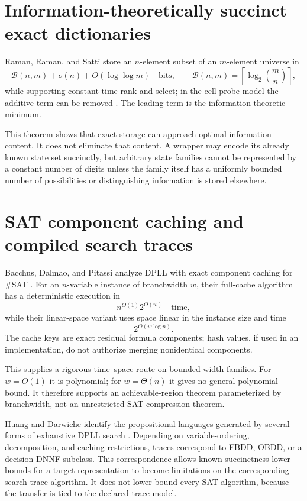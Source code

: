 \documentclass[11pt]{article}
\begin{document}
\section{Information-theoretically succinct exact dictionaries}

Raman, Raman, and Satti store an $n$-element subset of an $m$-element
universe in
\[
 \mathcal B(n,m)+o(n)+O(\log\log m)
 \quad\text{bits},\qquad
 \mathcal B(n,m)=\left\lceil\log_2\binom{m}{n}\right\rceil,
 \tag{11}
\]
while supporting constant-time rank and select; in the cell-probe model the
additive term can be removed \cite{raman2007}.  The leading term is the
information-theoretic minimum.

This theorem shows that exact storage can approach optimal information
content.  It does not eliminate that content.  A wrapper may encode its
already known state set succinctly, but arbitrary state families cannot be
represented by a constant number of digits unless the family itself has a
uniformly bounded number of possibilities or distinguishing information is
stored elsewhere.

\section{SAT component caching and compiled search traces}

Bacchus, Dalmao, and Pitassi analyze DPLL with exact component caching for
\#SAT \cite{bacchus2009}.  For an $n$-variable instance of branchwidth $w$,
their full-cache algorithm has a deterministic execution in
\[
 n^{O(1)}2^{O(w)}\quad\text{time},
 \tag{12}
\]
while their linear-space variant uses space linear in the instance size and
time
\[
 2^{O(w\log n)}.
 \tag{13}
\]
The cache keys are exact residual formula components; hash values, if used in
an implementation, do not authorize merging nonidentical components.

This supplies a rigorous time--space route on bounded-width families.  For
$w=O(1)$ it is polynomial; for $w=\Theta(n)$ it gives no general polynomial
bound.  It therefore supports an achievable-region theorem parameterized by
branchwidth, not an unrestricted SAT compression theorem.

Huang and Darwiche identify the propositional languages generated by several
forms of exhaustive DPLL search \cite{huangdarwiche2007}.  Depending on
variable-ordering, decomposition, and caching restrictions, traces correspond
to FBDD, OBDD, or a decision-DNNF subclass.  This correspondence allows known
succinctness lower bounds for a target representation to become limitations
on the corresponding search-trace algorithm.  It does not lower-bound every
SAT algorithm, because the transfer is tied to the declared trace model.
\end{document}
